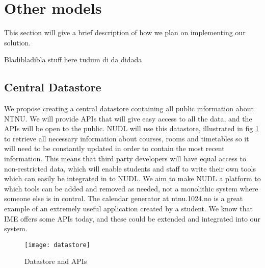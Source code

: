 \section{Other models}
	This section will give a brief description of how we plan on implementing our solution. 
	
	Bladibladibla stuff here tudum di da didada
	
	\subsection{Central Datastore}
		We propose creating a central datastore containing all public information about NTNU. We will provide APIs that will give easy access to all the data, and the APIs will be open to the public. 
NUDL will use this datastore, illustrated in fig \ref{fig:datastore} to retrieve all necessary information about courses, rooms and timetables so it will need to be constantly updated in order to contain the most recent information. This means that third party developers will have equal access to non-restricted data, which will enable students and staff to write their own tools which can easily be integrated in to NUDL. We aim to make NUDL a platform to which tools can be added and removed as needed, not a monolithic system where someone else is in control. The calendar generator at ntnu.1024.no is a great example of an extremely useful application created by a student. We know that IME offers some APIs today, and these could be extended and integrated into our system.
\begin{figure}[h]
\centering
\texttt{[image: datastore]}
\caption{Datastore and APIs}
\label{fig:datastore}
\end{figure}

